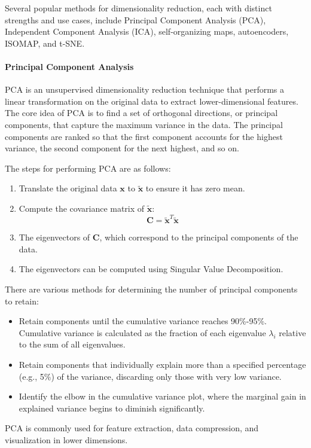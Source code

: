 Several popular methods for dimensionality reduction, each with distinct strengths and use cases, include Principal Component Analysis (PCA), Independent Component Analysis (ICA), self-organizing maps, autoencoders, ISOMAP, and t-SNE.

\paragraph*{Principal Component Analysis}
PCA is an unsupervised dimensionality reduction technique that performs a linear transformation on the original data to extract lower-dimensional features.
The core idea of PCA is to find a set of orthogonal directions, or principal components, that capture the maximum variance in the data. 
The principal components are ranked so that the first component accounts for the highest variance, the second component for the next highest, and so on.

The steps for performing PCA are as follows:
\begin{enumerate}
    \item Translate the original data $\mathbf{x}$ to $\tilde{\mathbf{x}}$ to ensure it has zero mean.
    \item Compute the covariance matrix of $\tilde{\mathbf{x}}$: 
        \[\mathbf{C}=\tilde{\mathbf{x}}^T\tilde{\mathbf{x}}\]
    \item The eigenvectors of $\mathbf{C}$, which correspond to the principal components of the data.
    \item The eigenvectors can be computed using Singular Value Decomposition. 
\end{enumerate}
There are various methods for determining the number of principal components to retain:
\begin{itemize} 
    \item Retain components until the cumulative variance reaches 90\%-95\%. 
        Cumulative variance is calculated as the fraction of each eigenvalue $\lambda_i$ relative to the sum of all eigenvalues. 
    \item Retain components that individually explain more than a specified percentage (e.g., 5\%) of the variance, discarding only those with very low variance. 
    \item Identify the elbow in the cumulative variance plot, where the marginal gain in explained variance begins to diminish significantly. 
\end{itemize}
PCA is commonly used for feature extraction, data compression, and visualization in lower dimensions.

